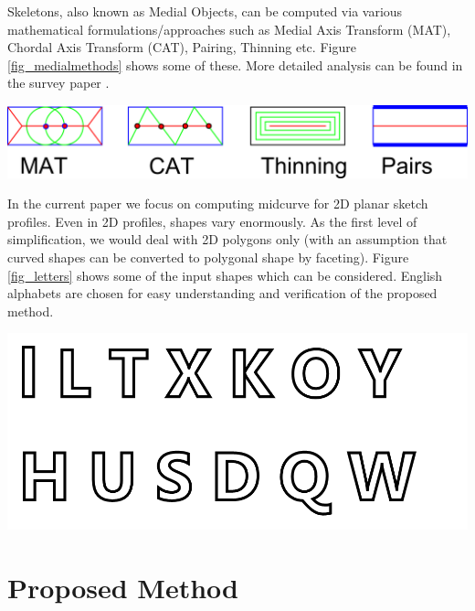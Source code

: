 \documentclass[10pt,twocolumn,letterpaper]{article}
\begin{document}
Skeletons, also known as Medial Objects, can be computed via various mathematical formulations/approaches such as Medial Axis Transform (MAT), Chordal Axis Transform (CAT), Pairing, Thinning etc. Figure \ref{fig_medialmethods} shows some of these. More detailed analysis can be found in the survey paper \cite{medial2010}.

    \begin{center}
	\includegraphics[width=\linewidth]{images/MedialMethodsOnlyShort}
	\label{fig_medialmethods}
    \end{center}
    

In the current paper we focus on computing midcurve for 2D planar sketch profiles.  Even in 2D profiles, shapes vary enormously. As the first level of simplification, we would deal with 2D polygons only (with an assumption that curved shapes can be converted to polygonal shape by faceting). Figure \ref{fig_letters} shows some of the input shapes which can be considered. English alphabets are chosen for easy understanding and verification of the proposed method.

     \begin{center}
	\includegraphics[width=0.8\linewidth]{images/Letters}
	\label{fig_letters}
    \end{center}

\section{Proposed Method}
\end{document}
